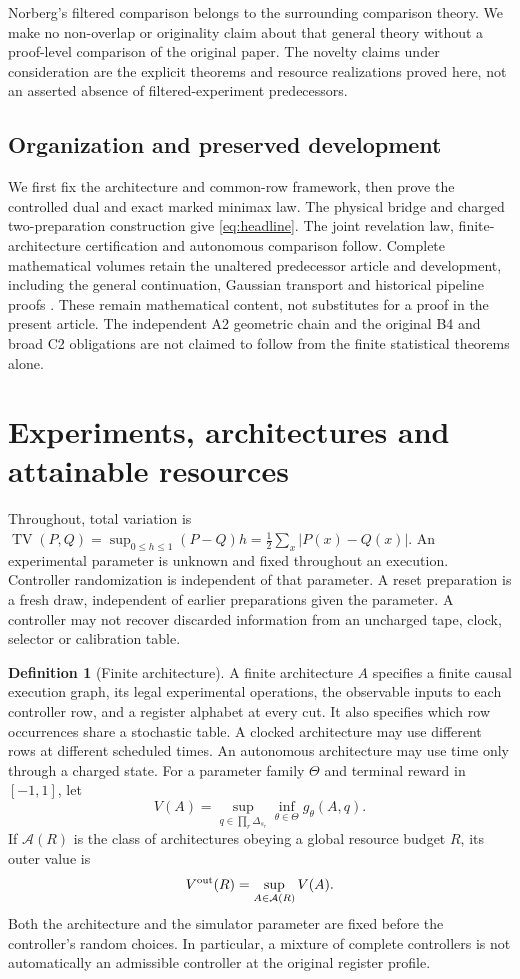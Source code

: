 \documentclass[11pt]{amsart}
\theoremstyle{definition}\newtheorem{definition}[theorem]{Definition}
\theoremstyle{remark}\newtheorem{remark}[theorem]{Remark}
\newcommand{\TV}{\operatorname{TV}}
\newcommand{\1}{\mathbf 1}
\newcommand{\cA}{\mathcal A}
\begin{document}
Norberg's filtered comparison \cite{Norberg} belongs to the surrounding
comparison theory. We make no non-overlap or originality claim about
that general theory without a proof-level comparison of the original
paper. The novelty claims under consideration are the explicit theorems
and resource realizations proved here, not an asserted absence of
filtered-experiment predecessors.

\subsection{Organization and preserved development}
We first fix the architecture and common-row framework, then prove the
controlled dual and exact marked minimax law. The physical bridge and
charged two-preparation construction give \eqref{eq:headline}. The
joint revelation law, finite-architecture certification and autonomous
comparison follow. Complete mathematical volumes retain the unaltered
predecessor article and development, including the general continuation,
Gaussian transport and historical pipeline proofs \cite{Companion}.
These remain mathematical content, not substitutes for a proof in the
present article. The independent A2 geometric chain and the original
B4 and broad C2 obligations are not claimed to follow from the finite
statistical theorems alone.

\section{Experiments, architectures and attainable resources}
\label{sec:model}
Throughout, total variation is
$\TV(P,Q)=\sup_{0\le h\le1}(P-Q)h=\frac12\sum_x|P(x)-Q(x)|$.
An experimental parameter is unknown and fixed throughout an execution.
Controller randomization is independent of that parameter. A reset
preparation is a fresh draw, independent of earlier preparations given
the parameter. A controller may not recover discarded information from
an uncharged tape, clock, selector or calibration table.

\begin{definition}[Finite architecture]
A finite architecture $A$ specifies a finite causal execution graph, its
legal experimental operations, the observable inputs to each controller
row, and a register alphabet at every cut. It also specifies which row
occurrences share a stochastic table. A clocked architecture may use
different rows at different scheduled times. An autonomous architecture
may use time only through a charged state. For a parameter family $\Theta$
and terminal reward in $[-1,1]$, let
\[
 V(A)=\sup_{q\in\prod_r\Delta_{s_r}}\inf_{\theta\in\Theta}
          g_\theta(A,q).
\]
If $\cA(R)$ is the class of architectures obeying a global resource budget
$R$, its outer value is
\[
 V^{\rm out}(R)=\sup_{A\in\cA(R)}V(A).
\]
Both the architecture and the simulator parameter are fixed before the
controller's random choices. In particular, a mixture of complete
controllers is not automatically an admissible controller at the original
register profile.
\end{definition}
\end{document}
